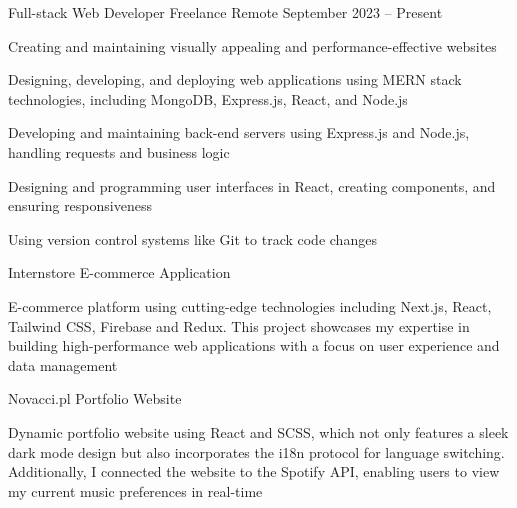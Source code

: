 \documentclass[]{awesome-cv}
\begin{document}
\vspace{-5mm}
\begin{cventries}
  \cventry
  {Full-stack Web Developer}
  {Freelance}
  {Remote}
  {September 2023 – Present}
  {\begin{cvitems}
    \item {Creating and maintaining visually appealing and performance-effective websites}
    \item {Designing, developing, and deploying web applications using MERN stack technologies, including MongoDB, Express.js, React, and Node.js}
    \item {Developing and maintaining back-end servers using Express.js and Node.js, handling requests and business logic}
    \item {Designing and programming user interfaces in React, creating components, and ensuring responsiveness}
    \item {Using version control systems like Git to track code changes}
    \end{cvitems}}
	\cventry
{Internstore}
  {E-commerce Application}
  {}
  {}
  {\begin{cvitems}
    \item {E-commerce platform using cutting-edge technologies including Next.js, React, Tailwind CSS, Firebase and Redux. This project showcases my expertise in building high-performance web applications with a focus on user experience and data management}
    \end{cvitems}}
	\cventry
{Novacci.pl}
  {Portfolio Website}
  {}
  {}
  {\begin{cvitems}
    \item {Dynamic portfolio website using React and SCSS, which not only features a sleek dark mode design but also incorporates the i18n protocol for language switching. Additionally, I connected the website to the Spotify API, enabling users to view my current music preferences in real-time}
    \end{cvitems}}
\end{cventries}
\vspace{-5mm}
\end{document}
